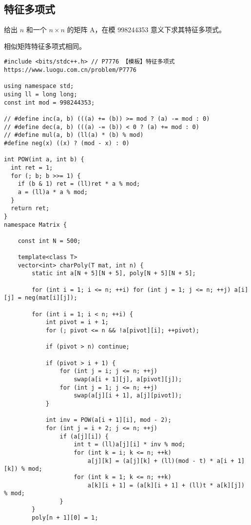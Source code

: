 \subsection{特征多项式}
\par \noindent 给出 $n$ 和一个 $n\times n$ 的矩阵 A，在模 998244353 意义下求其特征多项式。

\par \noindent 相似矩阵特征多项式相同。
\begin{verbatim}
#include <bits/stdc++.h> // P7776 【模板】特征多项式https://www.luogu.com.cn/problem/P7776

using namespace std;
using ll = long long;
const int mod = 998244353;

// #define inc(a, b) (((a) += (b)) >= mod ? (a) -= mod : 0)
// #define dec(a, b) (((a) -= (b)) < 0 ? (a) += mod : 0)
// #define mul(a, b) (ll(a) * (b) % mod)
#define neg(x) ((x) ? (mod - x) : 0)

int POW(int a, int b) {
  int ret = 1;
  for (; b; b >>= 1) {
    if (b & 1) ret = (ll)ret * a % mod;
    a = (ll)a * a % mod;
  }
  return ret;
}
namespace Matrix {

    const int N = 500;
    
    template<class T>
    vector<int> charPoly(T mat, int n) {
        static int a[N + 5][N + 5], poly[N + 5][N + 5];
    
        for (int i = 1; i <= n; ++i) for (int j = 1; j <= n; ++j) a[i][j] = neg(mat[i][j]);
    
        for (int i = 1; i < n; ++i) {
            int pivot = i + 1;
            for (; pivot <= n && !a[pivot][i]; ++pivot);
    
            if (pivot > n) continue;
    
            if (pivot > i + 1) {
                for (int j = i; j <= n; ++j)
                    swap(a[i + 1][j], a[pivot][j]);
                for (int j = 1; j <= n; ++j)
                    swap(a[j][i + 1], a[j][pivot]);
            }
    
            int inv = POW(a[i + 1][i], mod - 2);
            for (int j = i + 2; j <= n; ++j)
                if (a[j][i]) {
                    int t = (ll)a[j][i] * inv % mod;
                    for (int k = i; k <= n; ++k)
                        a[j][k] = (a[j][k] + (ll)(mod - t) * a[i + 1][k]) % mod;
                    for (int k = 1; k <= n; ++k)
                        a[k][i + 1] = (a[k][i + 1] + (ll)t * a[k][j]) % mod;
                }
        }
        poly[n + 1][0] = 1;
    

\end{verbatim}
